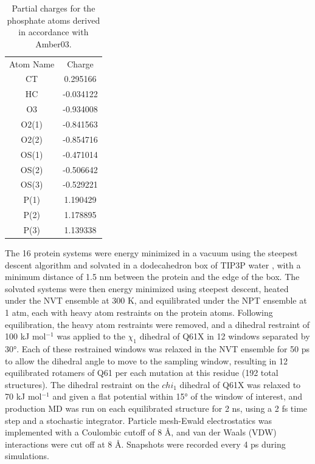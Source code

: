 \begin{table}
    \caption{Partial charges for the phosphate atoms derived in accordance with Amber03.}
    \begin{center}
    \begin{tabular}{cc}
    \toprule
       \rowcolor{lgray}
       Atom Name & Charge  \\
        \cmidrule(r){1-1}\cmidrule(l){2-2}
     CT  &        0.295166 \\
      HC &        -0.034122 \\
     O3  &       -0.934008   \\
     O2(1)  &   -0.841563   \\
     O2(2) &    -0.854716   \\
     OS(1)  &   -0.471014   \\
     OS(2)  &   -0.506642   \\
     OS(3) &    -0.529221   \\
     P(1)   &     1.190429   \\
     P(2)   &     1.178895   \\
     P(3)   &     1.139338   \\
    \bottomrule
    \end{tabular}
    \end{center}
    \label{tbl:ras-charges}
\end{table}

The 16 protein systems were energy minimized in a vacuum using the steepest descent algorithm and solvated in a dodecahedron box of TIP3P water \cite{Jorgensen1983}, with a minimum distance of 1.5 nm between the protein and the edge of the box. 
The solvated systems were then energy minimized using steepest descent, heated under the NVT ensemble at 300 K, and equilibrated under the NPT ensemble at 1 atm, each with heavy atom restraints on the protein atoms. 
Following equilibration, the heavy atom restraints were removed, and a dihedral restraint of 100 kJ mol$^{-1}$ was applied to the $\chi_1$ dihedral of Q61X in 12 windows separated by \ang{30}. 
Each of these restrained windows was relaxed in the NVT ensemble for 50 ps to allow the dihedral angle to move to the sampling window, resulting in 12 equilibrated rotamers of Q61 per each mutation at this residue (192 total structures). 
The dihedral restraint on the $chi_1$ dihedral of Q61X was relaxed to 70 kJ mol$^{-1}$ and given a flat potential within \ang{15} of the window of interest, and production MD was run on each equilibrated structure for 2 ns, using a 2 fs time step and a stochastic integrator. 
Particle mesh-Ewald electrostatics\cite{Cheatham1995} was implemented with a Coulombic cutoff of 8 \si{\angstrom}, and van der Waals (VDW) interactions were cut off at 8 \si{\angstrom}. 
Snapshots were recorded every 4 ps during simulations.

